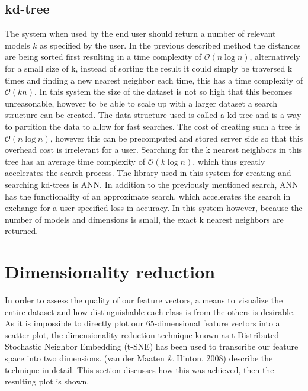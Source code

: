 \documentclass{bigdata}
\begin{document}
\subsection{kd-tree}
The system when used by the end user should return a number of relevant models $k$ as specified by the user. In the previous described method the distances are being sorted first resulting in a time complexity of $\mathcal{O}(n\log{}n)$, alternatively for a small size of k, instead of sorting the result it could simply be traversed k times and finding a new nearest neighbor each time, this has a time complexity of $\mathcal{O}(kn)$. In this system the size of the dataset is not so high that this becomes unreasonable, however to be able to scale up with a larger dataset a search structure can be created. The data structure used is called a kd-tree and is a way to partition the data to allow for fast searches. The cost of creating such a tree is $\mathcal{O}(n\log{}n)$, however this can be precomputed and stored server side so that this overhead cost is irrelevant for a user. Searching for the k nearest neighbors in this tree has an average time complexity of $\mathcal{O}(k\log{}n)$, which thus greatly accelerates the search process. 
The library used in this system for creating and searching kd-trees is ANN. In addition to the previously mentioned search, ANN has the functionality of an approximate search, which accelerates the search in exchange for a user specified loss in accuracy. In this system however, because the number of models and dimensions is small, the exact k nearest neighbors are returned. 

\section{Dimensionality reduction}
In order to assess the quality of our feature vectors, a means to visualize the entire dataset and how distinguishable each class is from the others is desirable. As it is impossible to directly plot our 65-dimensional feature vectors into a scatter plot, the dimensionality reduction technique known as t-Distributed Stochastic Neighbor Embedding (t-SNE) has been used to transcribe our feature space into two dimensions. (van der Maaten \& Hinton, 2008) describe the technique in detail. This section discusses how this was achieved, then the resulting plot is shown. 
\end{document}
